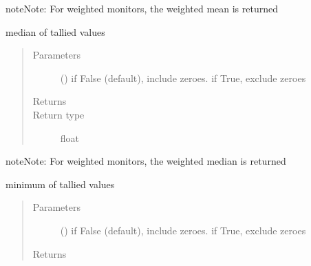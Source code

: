 \documentclass[letterpaper,10pt,english]{sphinxmanual}
\begin{document}
\begin{fulllineitems}
\begin{fulllineitems}
\begin{quote}
\begin{description}
\end{description}\end{quote}

\begin{sphinxadmonition}{note}{Note:}
For weighted monitors, the weighted mean is returned
\end{sphinxadmonition}

\end{fulllineitems}


\begin{fulllineitems}
\label{\detokenize{Reference:salabim.Monitor.median}}
median of tallied values
\begin{quote}\begin{description}
\item[{Parameters}] \leavevmode
{} () \textendash{} if False (default), include zeroes. if True, exclude zeroes

\item[{Returns}] \leavevmode
{}

\item[{Return type}] \leavevmode
float

\end{description}\end{quote}

\begin{sphinxadmonition}{note}{Note:}
For weighted monitors, the weighted median is returned
\end{sphinxadmonition}

\end{fulllineitems}


\begin{fulllineitems}
\label{\detokenize{Reference:salabim.Monitor.minimum}}
minimum of tallied values
\begin{quote}\begin{description}
\item[{Parameters}] \leavevmode
{} () \textendash{} if False (default), include zeroes. if True, exclude zeroes

\item[{Returns}] \leavevmode
{}


\end{description}
\end{quote}
\end{fulllineitems}
\end{fulllineitems}
\end{document}
